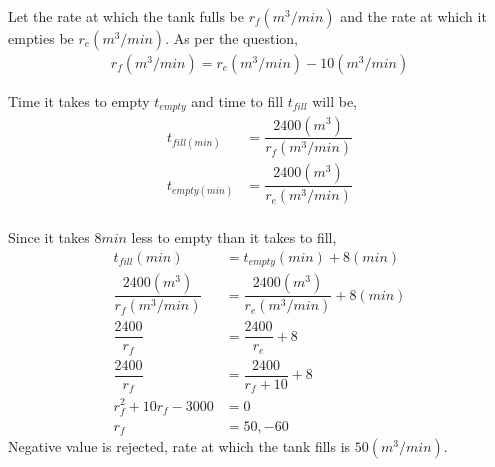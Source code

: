 \begin{solution}

  Let the rate at which the tank fulls be $r_f(m^3/min)$ and the rate at which it empties be $r_e(m^3/min)$. As per the question,
  \begin{align}
    r_f(m^3/min) = r_e(m^3/min) - 10(m^3/min)
  \end{align}
  
  Time it takes to empty $t_{empty}$ and time to fill $t_{fill}$ will be,
  \begin{align}
    t_{fill(min)}  &= \dfrac{2400(m^3)}{r_f(m^3/min)} \\
    t_{empty(min)} &= \dfrac{2400(m^3)}{r_e(m^3/min)} \\    
  \end{align}
  
  Since it takes $8min$ less to empty than it takes to fill,
  \begin{align}
    t_{fill}(min)                   &= t_{empty}(min)+8(min) \\
    \dfrac{2400(m^3)}{r_f(m^3/min)} &= 
    	\dfrac{2400(m^3)}{r_e(m^3/min)}+8(min) \\
    \dfrac{2400}{r_f}               &= \dfrac{2400}{r_e}+8 \\
    \dfrac{2400}{r_f}               &= \dfrac{2400}{r_f+10}+8 \\
    r_f^2 + 10r_f - 3000            &= 0 \\
    r_f                             &= 50, -60
  \end{align}
  Negative value is rejected, rate at which the tank fills is $50(m^3/min)$.
\end{solution}

